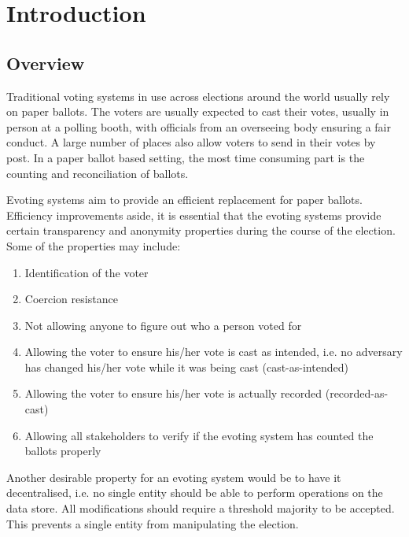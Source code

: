 
\chapter{Introduction} %

\label{Chapter1} %



\section{Overview}

Traditional voting systems in use across elections around the world usually rely on paper ballots. The voters are usually expected to cast their votes, usually in person at a polling booth, with officials from an overseeing body ensuring a fair conduct. A large number of places also allow voters to send in their votes by post. In a paper ballot based setting, the most time consuming part is the counting and reconciliation of ballots.

Evoting systems aim to provide an efficient replacement for paper ballots. Efficiency improvements aside, it is essential that the evoting systems provide certain transparency and anonymity properties during the course of the election. Some of the properties may include:

\begin{enumerate}
\item Identification of the voter
\item Coercion resistance
\item Not allowing anyone to figure out who a person voted for
\item Allowing the voter to ensure his/her vote is cast as intended, i.e. no adversary has changed his/her vote while it was being cast (cast-as-intended)
\item Allowing the voter to ensure his/her vote is actually recorded (recorded-as-cast)
\item Allowing all stakeholders to verify if the evoting system has counted the ballots properly
\end{enumerate}

Another desirable property for an evoting system would be to have it decentralised, i.e. no single entity should be able to perform operations on the data store. All modifications should require a threshold majority to be accepted. This prevents a single entity from manipulating the election.

